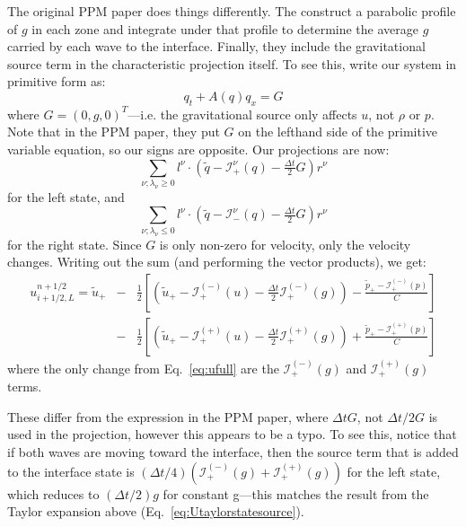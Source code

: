 \documentclass[11pt]{article}
\newcommand{\evm}{{(-)}}
\newcommand{\evp}{{(+)}}
\begin{document}
\begin{itemize}
The original PPM paper does things differently.  The construct a parabolic
profile of $g$ in each zone and integrate under that profile to determine
the average $g$ carried by each wave to the interface.  Finally, they include
the gravitational source term in the characteristic projection itself.
To see this, write our system in primitive form as:
\begin{equation}
q_t + A(q) q_x = G
\end{equation}
where $G = (0, g, 0)^T$---i.e. the gravitational source only affects
$u$, not $\rho$ or $p$.  Note that in the PPM paper, they put $G$ on 
the lefthand side of the primitive variable equation, so our signs are
opposite.  Our projections are now:
\begin{equation}
\sum_{\nu; \lambda_\nu \ge 0}l^\nu \cdot (\tilde{q} - \mathcal{I}^\nu_+(q) - \tfrac{\Delta t}{2} G) r^\nu
\end{equation}
for the left state, and
\begin{equation}
\sum_{\nu; \lambda_\nu \le 0} l^\nu \cdot (\tilde{q} - \mathcal{I}^\nu_-(q) - \tfrac{\Delta t}{2} G) r^\nu 
\end{equation}
for the right state.  Since $G$ is only non-zero for velocity, only
the velocity changes.  Writing out the sum (and performing the vector products), we
get:
\begin{eqnarray}
u_{i+1/2,L}^{n+1/2} =
   \tilde{u}_+ 
  &-& \frac{1}{2} \left [
      \left (\tilde{u}_+ - \mathcal{I}_+^\evm(u) - \frac{\Delta t}{2} \mathcal{I}^\evm_+(g) \right ) - 
       \frac{\tilde{p}_+ - \mathcal{I}_+^\evm(p)}{C} \right ] \nonumber \\
  &-& \frac{1}{2} \left [
      \left (\tilde{u}_+ - \mathcal{I}_+^\evp(u) - \frac{\Delta t}{2} \mathcal{I}^\evp_+(g) \right ) +
       \frac{\tilde{p}_+ - \mathcal{I}_+^\evp(p)}{C} \right ]
\end{eqnarray}
where the only change from Eq.~\ref{eq:ufull} are the
$\mathcal{I}^\evm_+(g)$ and $\mathcal{I}^\evp_+(g)$ terms.  

These differ from the expression in the PPM paper, where $\Delta t G$,
not $\Delta t/2 G$ is used in the projection, however this appears to
be a typo.  To see this, notice that if both waves are moving toward
the interface, then the source term that is added to the interface
state is $(\Delta t/4) (\mathcal{I}_+^\evm(g) +
\mathcal{I}_+^\evp(g))$ for the left state, which reduces to $(\Delta
t/2) g$ for constant g---this matches the result from the Taylor
expansion above (Eq.~\ref{eq:Utaylorstatesource}).




\end{itemize}
\end{document}
